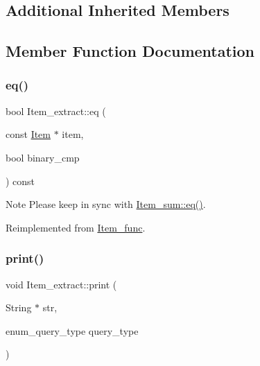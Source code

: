 \subsection*{Additional Inherited Members}


\subsection{Member Function Documentation}
\mbox{\label{classItem__extract_ad12d12826c6f4231a4dde0150732c5aa}} 
\subsubsection{\texorpdfstring{eq()}{eq()}}
{\footnotesize\ttfamily bool Item\+\_\+extract\+::eq (\begin{DoxyParamCaption}\item[{const \mbox{\hyperlink{classItem}{Item}} $\ast$}]{item,  }\item[{bool}]{binary\+\_\+cmp }\end{DoxyParamCaption}) const\hspace{0.3cm}{\ttfamily [virtual]}}

\begin{DoxyNote}{Note}
Please keep in sync with \mbox{\hyperlink{classItem__sum_aeab749252b834e0be4f00aac8ca523f5}{Item\+\_\+sum\+::eq()}}. 
\end{DoxyNote}


Reimplemented from \mbox{\hyperlink{classItem__func_a3de3f23377e6f0006dfccd375086365f}{Item\+\_\+func}}.

\mbox{\label{classItem__extract_a5a2c762763085131a38bd15816bd361b}} 
\subsubsection{\texorpdfstring{print()}{print()}}
{\footnotesize\ttfamily void Item\+\_\+extract\+::print (\begin{DoxyParamCaption}\item[{String $\ast$}]{str,  }\item[{enum\+\_\+query\+\_\+type}]{query\+\_\+type }\end{DoxyParamCaption})\hspace{0.3cm}{\ttfamily [virtual]}}

